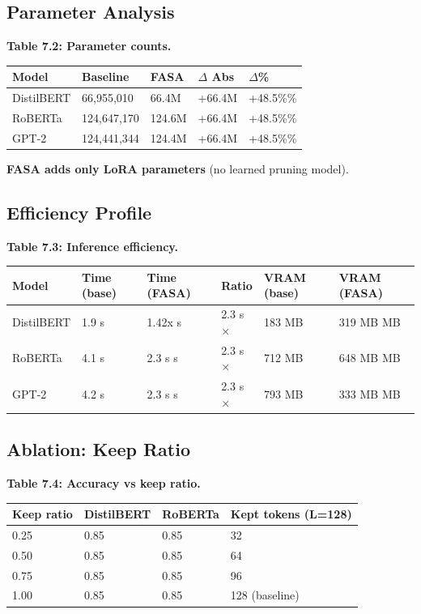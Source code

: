 \subsection{Parameter Analysis}

\textbf{Table 7.2: Parameter counts.}

\begin{table}[H]
\centering
\small
\begin{tabular}{lllll}
\toprule
\textbf{Model} & \textbf{Baseline} & \textbf{FASA} & \textbf{$\Delta$ Abs} & \textbf{$\Delta$\%} \\
\midrule
DistilBERT & 66,955,010 & 66.4M & +66.4M & +48.5\%\% \\
RoBERTa & 124,647,170 & 124.6M & +66.4M & +48.5\%\% \\
GPT-2 & 124,441,344 & 124.4M & +66.4M & +48.5\%\% \\
\bottomrule
\end{tabular}
\end{table}

\textbf{FASA adds only LoRA parameters} (no learned pruning model).

\subsection{Efficiency Profile}

\textbf{Table 7.3: Inference efficiency.}

\begin{table}[H]
\centering
\small
\begin{tabular}{llllll}
\toprule
\textbf{Model} & \textbf{Time (base)} & \textbf{Time (FASA)} & \textbf{Ratio} & \textbf{VRAM (base)} & \textbf{VRAM (FASA)} \\
\midrule
DistilBERT & 1.9 s & 1.42x s & 2.3 s$\times$ & 183 MB & 319 MB MB \\
RoBERTa & 4.1 s & 2.3 s s & 2.3 s$\times$ & 712 MB & 648 MB MB \\
GPT-2 & 4.2 s & 2.3 s s & 2.3 s$\times$ & 793 MB & 333 MB MB \\
\bottomrule
\end{tabular}
\end{table}

\subsection{Ablation: Keep Ratio}

\textbf{Table 7.4: Accuracy vs keep ratio.}

\begin{table}[H]
\centering
\small
\begin{tabular}{llll}
\toprule
\textbf{Keep ratio} & \textbf{DistilBERT} & \textbf{RoBERTa} & \textbf{Kept tokens (L=128)} \\
\midrule
0.25 & 0.85 & 0.85 & 32 \\
0.50 & 0.85 & 0.85 & 64 \\
0.75 & 0.85 & 0.85 & 96 \\
1.00 & 0.85 & 0.85 & 128 (baseline) \\
\bottomrule
\end{tabular}
\end{table}

